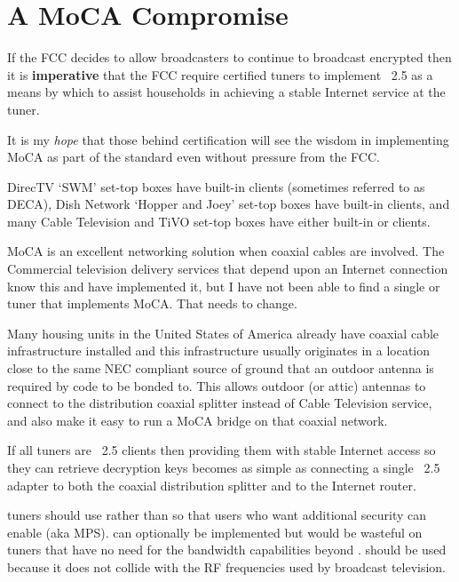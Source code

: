 \chapter{A MoCA Compromise}
\label{apx:moca}

If the FCC decides to allow broadcasters to continue to broadcast encrypted 
then it is \textbf{imperative} that the FCC require
\ngtv{} certified tuners to implement \xdband{}~2.5 as a means by which to
assist households in achieving a stable Internet service at the  tuner.

It is my \emph{hope} that those behind \ngtv{} certification will see the wisdom in
implementing MoCA as part of the standard even without pressure from the FCC.

DirecTV `SWM' set-top boxes have built-in \eband{} clients (sometimes referred to as DECA),
Dish Network `Hopper and Joey' set-top boxes have built-in \fband{} clients, and many Cable
Television and TiVO set-top boxes have either built-in \dband{} or \xdband{} clients.

MoCA is an excellent networking solution when coaxial cables are involved. The Commercial
television delivery services that depend upon an Internet connection know this and have
implemented it, but I have not been able to find a single  or  tuner
that implements MoCA. That needs to change.

Many housing units in the United States of America already have coaxial cable infrastructure
installed and this infrastructure usually originates in a location close to the same
NEC compliant source of ground that an outdoor antenna is required by code to be bonded
to. This allows outdoor (or attic) antennas to connect to the distribution coaxial splitter
instead of Cable Television service, and also make it easy to run a MoCA bridge on that coaxial
network.

If all \ngtv{} tuners are \xdband{}~2.5 clients then providing them with stable
Internet access so they can retrieve decryption keys becomes as simple as connecting a
single \xdband{}~2.5 adapter to both the coaxial distribution splitter and to the
Internet router.

\ngtv{} tuners should use  rather than  so that users who want additional
security can enable  (aka MPS).  can optionally
be implemented but would be wasteful on  tuners that have no need for the
bandwidth capabilities beyond . \xdband{} should be used because it does not collide
with the RF frequencies used by broadcast television.


